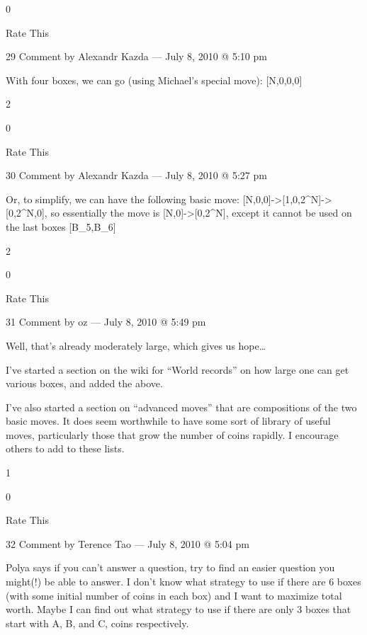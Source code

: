             0
             
            Rate This

            29 Comment by Alexandr Kazda — July 8, 2010 @ 5:10 pm

                With four boxes, we can go (using Michael’s special move):
                [N,0,0,0]\to [1,0,2^N,0]\to [1,0,2^N-1,2]\to[0,2^N-1,0,2]\to[0,0,2^{2^N}]
                 
                2
                 
                0
                 
                Rate This

                30 Comment by Alexandr Kazda — July 8, 2010 @ 5:27 pm

                    Or, to simplify, we can have the following basic move: [N,0,0]->[1,0,2^N]->[0,2^N,0],
                    so essentially the move is [N,0]->[0,2^N], except it cannot be used on the last boxes [B_5,B_6]
                     
                    2
                     
                    0
                     
                    Rate This

                    31 Comment by oz — July 8, 2010 @ 5:49 pm

        Well, that’s already moderately large, which gives us hope…

        I’ve started a section on the wiki for “World records” on how large one can get various boxes, and added the above.

        I’ve also started a section on “advanced moves” that are compositions of the two basic moves. It does seem worthwhile to have some sort of library of useful moves, particularly those that grow the number of coins rapidly. I encourage others to add to these lists.
         
        1
         
        0
         
        Rate This

        32 Comment by Terence Tao — July 8, 2010 @ 5:04 pm

    Polya says if you can’t answer a question, try to find an easier question you might(!) be able to answer. I don’t know what strategy to use if there are 6 boxes (with some initial number of coins in each box) and I want to maximize total worth. Maybe I can find out what strategy to use if there are only 3 boxes that start with A, B, and C, coins respectively.
     
